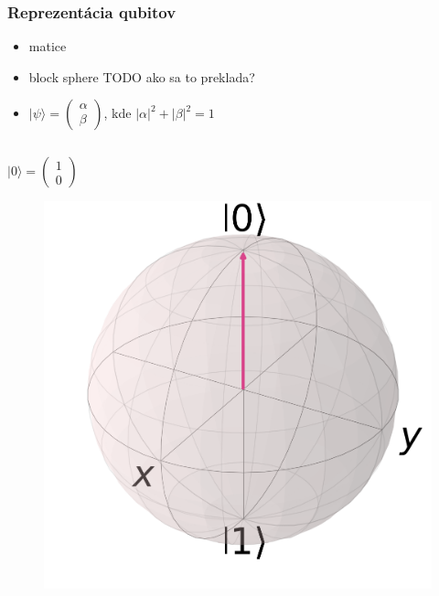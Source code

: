 \documentclass{beamer}
\newcommand{\ket}[1]{\lvert#1\rangle} %
\newcommand\abs[1]{\left|#1\right|}
\begin{document}
\begin{frame}
	\frametitle{Reprezentácia qubitov}
	\begin{itemize}
		\item matice
		\item block sphere {\color{red} TODO ako sa to preklada?}
		\item $\ket{\psi} = \begin{pmatrix}
		      \alpha \\
		      \beta
		\end{pmatrix}$, kde $\abs{\alpha}^2 + \abs{\beta}^2 = 1$ 
	\end{itemize}
	\begin{columns}[c]
		\begin{column}{.3\textwidth}
			\centering
			$\ket{0} = \begin{pmatrix}
			1\\
			0
			\end{pmatrix}$
			\begin{figure}
				\centering
				\includegraphics[width=1\textwidth]{qubit0.png}            
			\end{figure}
		\end{column}
				

\end{columns}
\end{frame}
\end{document}
